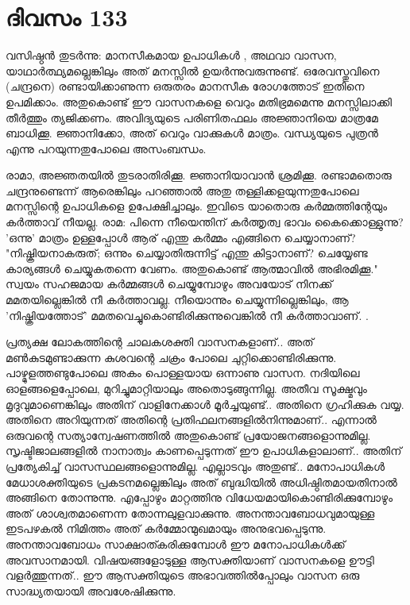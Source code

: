 \newpage
\section{ദിവസം 133}


വസിഷ്ഠന്‍ തുടര്‍ന്നു: മാനസീകമായ ഉപാധികള്‍ , അഥവാ വാസന, യാഥാര്‍ത്ഥ്യമല്ലെങ്കിലും അത്‌ മനസ്സില്‍ ഉയര്‍ന്നുവരുന്നുണ്ട്‌. ഒരേവസ്തുവിനെ (ചന്ദ്രനെ) രണ്ടായിക്കാണുന്ന ഒരുതരം മാനസീക രോഗത്തോട്‌ ഇതിനെ ഉപമിക്കാം. അതുകൊണ്ട്‌ ഈ വാസനകളെ വെറും മതിഭ്രമമെന്നു മനസ്സിലാക്കി തീര്‍ത്തും ത്യജിക്കണം. അവിദ്യയുടെ പരിണിതഫലം അജ്ഞാനിയെ മാത്രമേ ബാധിക്കൂ. ജ്ഞാനിക്കോ, അത്‌ വെറും വാക്കുകള്‍ മാത്രം. വന്ധ്യയുടെ പുത്രന്‍ എന്നു പറയുന്നതുപോലെ അസംബന്ധം.

രാമാ, അജ്ഞതയില്‍ തുടരാതിരിക്കൂ. ജ്ഞാനിയാവാന്‍ ശ്രമിക്കൂ. രണ്ടാമതൊരു ചന്ദ്രനുണ്ടെന്ന് ആരെങ്കിലും പറഞ്ഞാല്‍ അതു തള്ളിക്കളയുന്നതുപോലെ മനസ്സിന്റെ ഉപാധികളെ ഉപേക്ഷിച്ചാലും. ഇവിടെ യാതൊരു കര്‍മ്മത്തിന്റേയും കര്‍ത്താവ്‌ നീയല്ല. രാമ: പിന്നെ നീയെന്തിന്‌ കര്‍ത്തൃത്വ ഭാവം കൈക്കൊള്ളുന്നു? 'ഒന്നു' മാത്രം ഉള്ളപ്പോള്‍ ആര്‌ എന്തു കര്‍മ്മം എങ്ങിനെ ചെയ്യാനാണ്‌? "നിഷ്ക്രിയനാകരുത്‌; ഒന്നും ചെയ്യാതിരുന്നിട്ട്‌ എന്തു കിട്ടാനാണ്‌? ചെയ്യേണ്ട കാര്യങ്ങള്‍ ചെയ്യുകതന്നെ വേണം. അതുകൊണ്ട്‌ ആത്മാവില്‍ അഭിരമിക്കൂ." സ്വയം സഹജമായ കര്‍മ്മങ്ങള്‍ ചെയ്യുമ്പോഴും അവയോട്‌ നിനക്ക്‌ മമതയില്ലെങ്കില്‍ നീ കര്‍ത്താവല്ല. നീയൊന്നും ചെയ്യുന്നില്ലെങ്കിലും, ആ 'നിഷ്ക്രിയത്തോട്‌' മമതവെച്ചുകൊണ്ടിരിക്കുന്നുവെങ്കില്‍ നീ കര്‍ത്താവാണ്‌. .

പ്രത്യക്ഷ ലോകത്തിന്റെ ചാലകശക്തി വാസനകളാണ്‌.. അത്‌ മണ്‍കുടമുണ്ടാക്കുന്ന കുശവന്റെ ചക്രം പോലെ ചുറ്റിക്കൊണ്ടിരിക്കുന്നു. പാഴ്മുളത്തണ്ടുപോലെ അകം പൊള്ളയായ ഒന്നാണു വാസന. നദിയിലെ ഓളങ്ങളെപ്പോലെ, മുറിച്ചുമാറ്റിയാലും അതൊടുങ്ങുന്നില്ല. അതീവ സൂക്ഷ്മവും മൃദുവുമാണെങ്കിലും അതിന്‌ വാളിനേക്കാള്‍ മൂര്‍ച്ചയുണ്ട്‌.. അതിനെ ഗ്രഹിക്കുക വയ്യ. അതിനെ അറിയുന്നത്‌ അതിന്റെ പ്രതിഫലനങ്ങളില്‍നിന്നുമാണ്‌.. എന്നാല്‍ ഒരുവന്റെ സത്യാന്വേഷണത്തില്‍ അതുകൊണ്ട്‌ പ്രയോജനങ്ങളൊന്നുമില്ല. സൃഷ്ടിജാലങ്ങളില്‍ നാനാത്വം കാണപ്പെടുന്നത്‌ ഈ ഉപാധികളാലാണ്‌..  അതിന്‌ പ്രത്യേകിച്ച്‌ വാസസ്ഥലങ്ങളൊന്നുമില്ല. എല്ലാടവും അതുണ്ട്‌..  മനോപാധികള്‍ മേധാശക്തിയുടെ പ്രകടനമല്ലെങ്കിലും അത്‌ ബുദ്ധിയില്‍ അധിഷ്ഠിതമായതിനാല്‍ അങ്ങിനെ തോന്നുന്നു. എപ്പോഴും മാറ്റത്തിനു വിധേയമായികൊണ്ടിരിക്കുമ്പോഴും അത്‌ ശാശ്വതമാണെന്ന തോന്നലുളവാക്കുന്നു. അനന്താവബോധവുമായുള്ള ഇടപഴകല്‍ നിമിത്തം അത്‌ കര്‍മ്മോന്മുഖമായും അനുഭവപ്പെടുന്നു. അനന്താവബോധം സാക്ഷാത്കരിക്കുമ്പോള്‍ ഈ മനോപാധികള്‍ക്ക്‌ അവസാനമായി. വിഷയങ്ങളോടുള്ള ആസക്തിയാണ്‌ വാസനകളെ ഊട്ടി വളര്‍ത്തുന്നത്‌.. ഈ ആസക്തിയുടെ അഭാവത്തില്‍പ്പോലും വാസന ഒരു സാദ്ധ്യതയായി അവശേഷിക്കുന്നു. 

